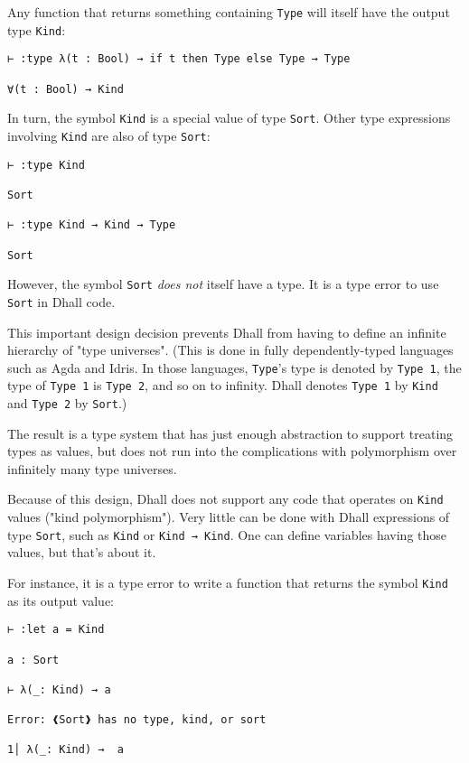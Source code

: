 Any function that returns something containing \lstinline!Type! will itself have the output type \lstinline!Kind!:


\begin{lstlisting}[language=Dhall]
⊢ :type λ(t : Bool) → if t then Type else Type → Type

∀(t : Bool) → Kind
\end{lstlisting}


In turn, the symbol \lstinline!Kind! is a special value of type \lstinline!Sort!.
Other type expressions involving \lstinline!Kind! are also of type \lstinline!Sort!:


\begin{lstlisting}[language=Dhall]
⊢ :type Kind

Sort

⊢ :type Kind → Kind → Type

Sort
\end{lstlisting}


However, the symbol \lstinline!Sort! \emph{does not} itself have a type.
It is a type error to use \lstinline!Sort! in Dhall code.


This important design decision prevents Dhall from having to define an infinite hierarchy of "type universes".
(This is done in fully dependently-typed languages such as Agda and Idris.
In those languages, \lstinline!Type!'s type is denoted by \lstinline!Type 1!, the type of \lstinline!Type 1! is \lstinline!Type 2!, and so on to infinity.
Dhall denotes \lstinline!Type 1! by \lstinline!Kind! and \lstinline!Type 2! by \lstinline!Sort!.)


The result is a type system that has just enough abstraction to support treating types as values, but does not run into the complications with polymorphism over infinitely many type universes.


Because of this design, Dhall does not support any code that operates on \lstinline!Kind! values ("kind polymorphism").
Very little can be done with Dhall expressions of type \lstinline!Sort!, such as \lstinline!Kind! or \lstinline!Kind → Kind!.
One can define variables having those values, but that's about it.


For instance, it is a type error to write a function that returns the symbol \lstinline!Kind! as its output value:


\begin{lstlisting}[language=Dhall]
⊢ :let a = Kind

a : Sort

⊢ λ(_: Kind) → a

Error: ❰Sort❱ has no type, kind, or sort

1│ λ(_: Kind) →  a
\end{lstlisting}


